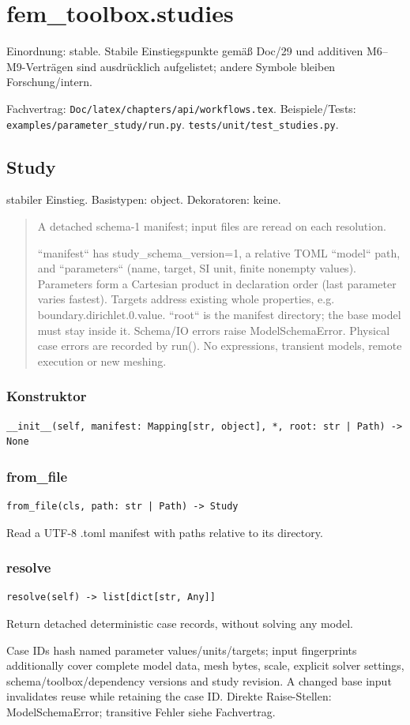 \section{fem\_toolbox.studies}
Einordnung: stable. Stabile Einstiegspunkte gemäß Doc/29 und additiven M6–M9-Verträgen sind ausdrücklich aufgelistet; andere Symbole bleiben Forschung/intern.
\par Fachvertrag: \nolinkurl{Doc/latex/chapters/api/workflows.tex}. Beispiele/Tests:
\nolinkurl{examples/parameter_study/run.py}.
\nolinkurl{tests/unit/test_studies.py}.
\subsection{Study}
stabiler Einstieg.
Basistypen: object. Dekoratoren: keine.
\begin{quote}
A detached schema-1 manifest; input files are reread on each resolution.\par ``manifest`` has study\_schema\_version=1, a relative TOML ``model`` path, and ``parameters`` (name, target, SI unit, finite nonempty values). Parameters form a Cartesian product in declaration order (last parameter varies fastest). Targets address existing whole properties, e.g. boundary.dirichlet.0.value. ``root`` is the manifest directory; the base model must stay inside it. Schema/IO errors raise ModelSchemaError. Physical case errors are recorded by run(). No expressions, transient models, remote execution or new meshing.
\end{quote}
\subsubsection*{Konstruktor}
\begin{lstlisting}
__init__(self, manifest: Mapping[str, object], *, root: str | Path) -> None
\end{lstlisting}
\subsubsection*{from\_file}
\begin{lstlisting}
from_file(cls, path: str | Path) -> Study
\end{lstlisting}
Read a UTF-8 .toml manifest with paths relative to its directory.
\subsubsection*{resolve}
\begin{lstlisting}
resolve(self) -> list[dict[str, Any]]
\end{lstlisting}
Return detached deterministic case records, without solving any model.\par Case IDs hash named parameter values/units/targets; input fingerprints additionally cover complete model data, mesh bytes, scale, explicit solver settings, schema/toolbox/dependency versions and study revision. A changed base input invalidates reuse while retaining the case ID.
Direkte Raise-Stellen: ModelSchemaError; transitive Fehler siehe Fachvertrag.
